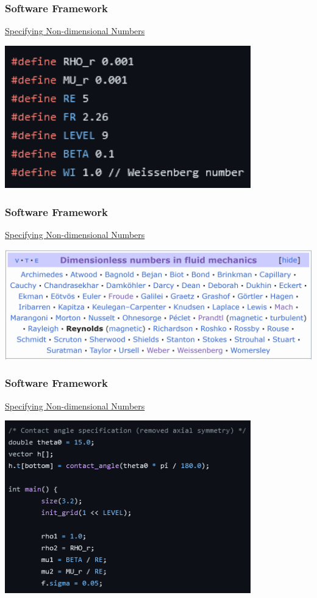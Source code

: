 \documentclass[12pt]{beamer}
\begin{document}
\begin{frame}
    \frametitle{Software Framework}
    \underline{Specifying Non-dimensional Numbers}

    \includegraphics[width=0.8\textwidth]{img/numbers.png}
\end{frame}
\begin{frame}
    \frametitle{Software Framework}
    \underline{Specifying Non-dimensional Numbers}

    \includegraphics[width=\textwidth]{img/numberslist.png}
\end{frame}
\begin{frame}
    \frametitle{Software Framework}
    \underline{Specifying Non-dimensional Numbers}

    \includegraphics[width=0.8\textwidth]{img/more-numbers.png}
\end{frame}
\end{document}
